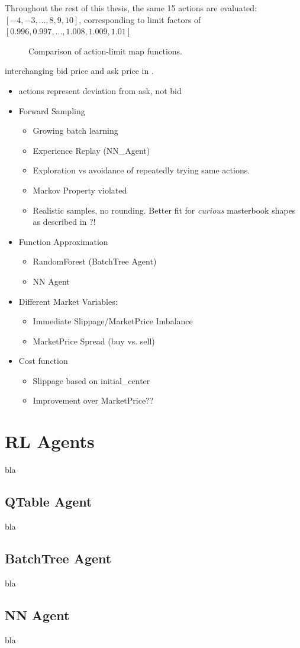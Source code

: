 Throughout the rest of this thesis, the same 15 actions are evaluated: $[-4, -3, ..., 8, 9, 10]$, corresponding to limit factors of $[0.996, 0.997, ..., 1.008, 1.009, 1.01]$\\

\begin{figure}[ht]
	\centering
	[placeholder]
	\caption{Comparison of action-limit map functions.}
	\label{fig:actionlimitmapping}
\end{figure}

interchanging bid price and ask price in .

\begin{itemize}
\item actions represent deviation from ask, not bid
\item Forward Sampling
\begin{itemize}
\item Growing batch learning
\item Experience Replay (NN\_Agent)
\item Exploration vs avoidance of repeatedly trying same actions.
\end{itemize}
\begin{itemize}
\item Markov Property violated
\item Realistic samples, no rounding. Better fit for \emph{curious} masterbook shapes as described in ?!
\end{itemize}
\item Function Approximation
\begin{itemize}
\item RandomForest (BatchTree Agent)
\item NN Agent
\end{itemize}
\item Different Market Variables:
\begin{itemize}
\item Immediate Slippage/MarketPrice Imbalance
\item MarketPrice Spread (buy vs. sell)
\end{itemize}
\item Cost function
\begin{itemize}
\item Slippage based on initial\_center
\item Improvement over MarketPrice??
\end{itemize}
\end{itemize}

\section{RL Agents}
bla

\subsection{QTable Agent}
bla

\subsection{BatchTree Agent}
bla

\subsection{NN Agent}
bla

\cleardoublepage{}